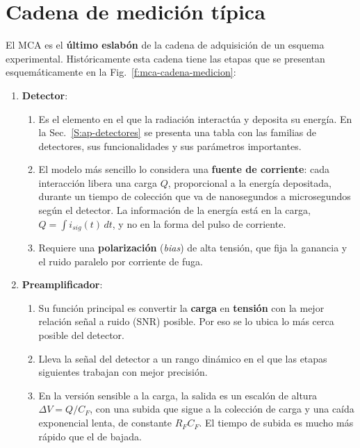 \section{Cadena de medición típica}
\label{S:mca-cadena-medicion}

El MCA es el \textbf{último eslabón} de la cadena de adquisición de un esquema
experimental. Históricamente esta cadena tiene las etapas que se presentan
esquemáticamente en la Fig.~\ref{f:mca-cadena-medicion}:
\begin{enumerate}
  \item \textbf{Detector}:
  \begin{enumerate}
    \item Es el elemento en el que la radiación interactúa y deposita su
      energía. En la Sec.~\ref{S:ap-detectores} se presenta una tabla con
      las familias de detectores, sus funcionalidades y sus parámetros
      importantes.
    \item El modelo más sencillo lo considera una \textbf{fuente de corriente}:
      cada interacción libera una carga $Q$, proporcional a la energía
      depositada, durante un tiempo de colección que va de nanosegundos a
      microsegundos según el detector. La información de la energía está en la
      carga, $Q = \int i_{sig}(t)\,dt$, y no en la forma del pulso de corriente.
    \item Requiere una \textbf{polarización} (\emph{bias}) de alta tensión, que
      fija la ganancia y el ruido paralelo por corriente de fuga.
  \end{enumerate}
  \item \textbf{Preamplificador}:
  \begin{enumerate}
    \item Su función principal es convertir la \textbf{carga} en
      \textbf{tensión} con la mejor relación señal a ruido (SNR) posible. Por eso
      se lo ubica lo más cerca posible del detector.
    \item Lleva la señal del detector a un rango dinámico en el que las etapas
      siguientes trabajan con mejor precisión.
    \item En la versión sensible a la carga, la salida es un escalón de altura
      $\Delta V = Q/C_F$, con una subida que sigue a la colección de carga y una
      caída exponencial lenta, de constante $R_F C_F$. El tiempo de subida es
      mucho más rápido que el de bajada.
  \end{enumerate}

\end{enumerate}
